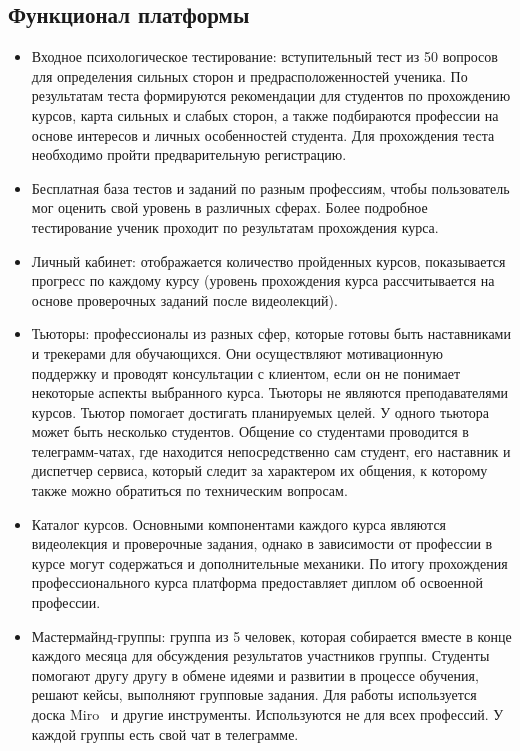 \documentclass[12pt]{article}
\begin{document}
\subsection{Функционал платформы}
\begin{itemize}
    \item Входное психологическое тестирование: вступительный тест из 50 вопросов для определения сильных сторон и предрасположенностей ученика. По результатам теста формируются рекомендации для студентов по прохождению курсов, карта сильных и слабых сторон, а также подбираются профессии на основе интересов и личных особенностей студента. Для прохождения теста необходимо пройти предварительную регистрацию.
    \item Бесплатная база тестов и заданий по разным профессиям, чтобы пользователь мог оценить свой уровень в различных сферах. Более подробное тестирование ученик проходит по результатам прохождения курса.
    \item Личный кабинет: отображается количество пройденных курсов, показывается прогресс по каждому курсу (уровень прохождения курса рассчитывается на основе проверочных заданий после видеолекций).
    \item Тьюторы: профессионалы из разных сфер, которые готовы быть наставниками и трекерами для обучающихся. Они осуществляют мотивационную поддержку и проводят консультации с клиентом, если он не понимает некоторые аспекты выбранного курса. Тьюторы не являются преподавателями курсов. Тьютор помогает достигать планируемых целей. У одного тьютора может быть несколько студентов. Общение со студентами проводится в телеграмм-чатах, где находится непосредственно сам студент, его наставник и диспетчер сервиса, который следит за характером их общения, к которому также можно обратиться по техническим вопросам. 
    \item Каталог курсов. Основными компонентами каждого курса являются видеолекция и проверочные задания, однако в зависимости от профессии в курсе могут содержаться и дополнительные механики. По итогу прохождения профессионального курса платформа предоставляет диплом об освоенной профессии.
    \item Мастермайнд-группы: группа из 5 человек, которая собирается вместе в конце каждого месяца для обсуждения результатов участников группы. Студенты помогают другу другу в обмене идеями и развитии в процессе обучения, решают кейсы, выполняют групповые задания. Для работы используется доска Miro~\cite{Miro} и другие инструменты. Используются не для всех профессий. У каждой группы есть свой чат в телеграмме. 
\end{itemize}
\end{document}
